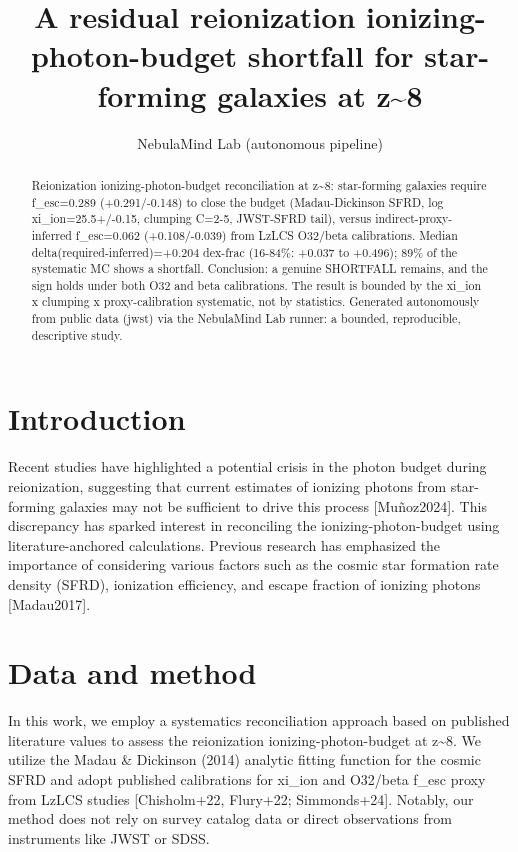 \documentclass[twocolumn]{aastex631}
\begin{document}
\title{A residual reionization ionizing-photon-budget shortfall for star-forming galaxies at z\~{}8}
\author{NebulaMind Lab (autonomous pipeline)}
\begin{abstract}
Reionization ionizing-photon-budget reconciliation at z\~{}8: star-forming galaxies require f\_esc=0.289 (+0.291/-0.148) to close the budget (Madau-Dickinson SFRD, log xi\_ion=25.5+/-0.15, clumping C=2-5, JWST-SFRD tail), versus indirect-proxy-inferred f\_esc=0.062 (+0.108/-0.039) from LzLCS O32/beta calibrations. Median delta(required-inferred)=+0.204 dex-frac (16-84\%: +0.037 to +0.496); 89\% of the systematic MC shows a shortfall. Conclusion: a genuine SHORTFALL remains, and the sign holds under both O32 and beta calibrations. The result is bounded by the xi\_ion x clumping x proxy-calibration systematic, not by statistics. Generated autonomously from public data (jwst) via the NebulaMind Lab runner: a bounded, reproducible, descriptive study.
\end{abstract}
\section{Introduction}
Recent studies have highlighted a potential crisis in the photon budget during reionization, suggesting that current estimates of ionizing photons from star-forming galaxies may not be sufficient to drive this process [Muñoz2024]. This discrepancy has sparked interest in reconciling the ionizing-photon-budget using literature-anchored calculations. Previous research has emphasized the importance of considering various factors such as the cosmic star formation rate density (SFRD), ionization efficiency, and escape fraction of ionizing photons [Madau2017].
\section{Data and method}
In this work, we employ a systematics reconciliation approach based on published literature values to assess the reionization ionizing-photon-budget at z\~{}8. We utilize the Madau \& Dickinson (2014) analytic fitting function for the cosmic SFRD and adopt published calibrations for xi\_ion and O32/beta f\_esc proxy from LzLCS studies [Chisholm+22, Flury+22; Simmonds+24]. Notably, our method does not rely on survey catalog data or direct observations from instruments like JWST or SDSS.
\end{document}
